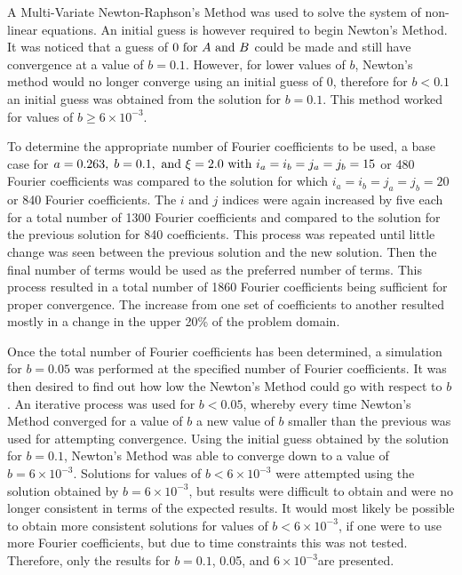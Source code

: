 A Multi-Variate Newton-Raphson's Method was used to solve the system of non-linear equations. An
initial guess is however required to begin Newton's Method. It was noticed that a guess of
$0\text{ for } A\text{ and } B$ could be made and still have convergence at a value of $b=0.1$.
However, for lower values of $b$, Newton's method would no longer converge using an initial guess of
$0$, therefore for $b<0.1$ an initial guess was obtained from the solution for $b=0.1$. This method
worked for values of $b\ge 6\times 10^{-3} $.

To determine the appropriate number of Fourier coefficients to be used, a base case for $a=0.263, \;
b=0.1,\text{ and } \xi =2.0\text{ with } i_{a} =i_{b} =j_{a} =j_{b} =15$ or 480 Fourier coefficients
was compared to the solution for which $i_{a} =i_{b} =j_{a} =j_{b} =20$ or 840 Fourier coefficients.
The $i$ and $j$ indices were again increased by five each for a total number of 1300 Fourier
coefficients and compared to the solution for the previous solution for 840 coefficients. This
process was repeated until little change was seen between the previous solution and the new
solution. Then the final number of terms would be used as the preferred number of terms. This
process resulted in a total number of 1860 Fourier coefficients being sufficient for proper
convergence. The increase from one set of coefficients to another resulted mostly in a change in the
upper 20\% of the problem domain.

Once the total number of Fourier coefficients has been determined, a simulation for $b=0.05$ was
performed at the specified number of Fourier coefficients. It was then desired to find out how low
the Newton's Method could go with respect to $b$. An iterative process was used for $b<0.05$,
whereby every time Newton's Method converged for a value of $b$ a new value of $b$ smaller than the
previous was used for attempting convergence. Using the initial guess obtained by the solution for
$b=0.1$, Newton's Method was able to converge down to a value of $b=6\times 10^{-3} $. Solutions for
values of $b<6\times 10^{-3} $ were attempted using the solution obtained by $b=6\times 10^{-3} $,
but results were difficult to obtain and were no longer consistent in terms of the expected results.
It would most likely be possible to obtain more consistent solutions for values of $b<6\times
10^{-3} $, if one were to use more Fourier coefficients, but due to time constraints this was not
tested. Therefore, only the results for $b=0.1$, 0.05, and $6\times 10^{-3} $are presented.

